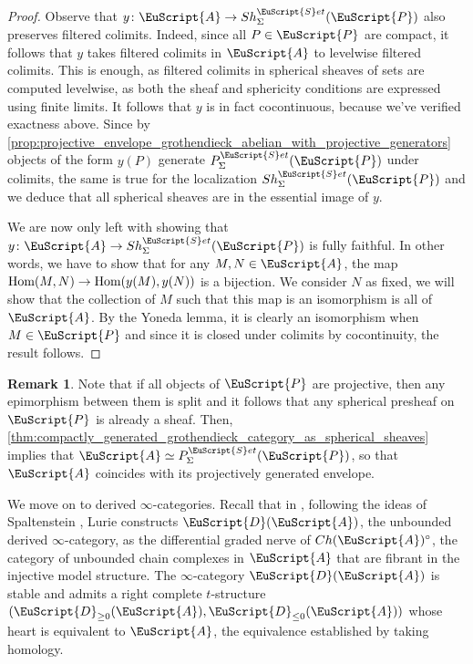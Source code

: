 \documentclass[oneside,a4paper]{amsart}
\newcommand{\euscr}[1]{\EuScript{#1}} %
\newcommand{\acat}{\euscr{A}} %
\newcommand{\dcat}{\euscr{D}} %
\newcommand{\pcat}{\euscr{P}} %
\newcommand{\Hom}{\textnormal{Hom}} %
\newcommand{\sets}{\euscr{S}et} %
\theoremstyle{plain}
\theoremstyle{definition}
\newtheorem{rem}[thm]{Remark}
\theoremstyle{remark}
\begin{document}
\begin{proof}
Observe that $y \colon \acat \rightarrow Sh_{\Sigma}^{\sets}(\pcat)$ also preserves filtered colimits. Indeed, since all $P \in \pcat$ are compact, it follows that $y$ takes filtered colimits in $\acat$ to levelwise filtered colimits. This is enough, as filtered colimits in spherical sheaves of sets are computed levelwise, as both the sheaf and sphericity conditions are expressed using finite limits. It follows that $y$ is in fact cocontinuous, because we've verified exactness above. Since by \cref{prop:projective_envelope_grothendieck_abelian_with_projective_generators} objects of the form $y(P)$ generate $P_{\Sigma}^{\sets}(\pcat)$ under colimits, the same is true for the localization $Sh_{\Sigma}^{\sets}(\pcat)$ and we deduce that all spherical sheaves are in the essential image of $y$. 

We are now only left with showing that $y \colon \acat \rightarrow Sh_{\Sigma}^{\sets}(\pcat)$ is fully faithful. In other words, we have to show that for any $M, N \in \acat$, the map $\Hom(M, N) \rightarrow \Hom(y(M), y(N))$ is a bijection. We consider $N$ as fixed, we will show that the collection of $M$ such that this map is an isomorphism is all of $\acat$. By the Yoneda lemma, it is clearly an isomorphism when $M \in \pcat$ and since it is closed under colimits by cocontinuity, the result follows.
\end{proof}

\begin{rem}
\label{rem:grothendieck_category_generated_by_compact_projectives_as_a_presheaf_category}
Note that if all objects of $\pcat$ are projective, then any epimorphism between them is split and it follows that any spherical presheaf on $\pcat$ is already a sheaf. Then, \cref{thm:compactly_generated_grothendieck_category_as_spherical_sheaves} implies that $\acat \simeq P_{\Sigma}^{\sets}(\pcat)$, so that $\acat$ coincides with its projectively generated envelope. 
\end{rem}

We move on to derived $\infty$-categories. Recall that in \cite[1.3.5]{higher_algebra}, following the ideas of Spaltenstein \cite{spaltenstein1988resolutions}, Lurie constructs $\dcat(\acat)$, the unbounded derived $\infty$-category, as the differential graded nerve of $Ch(\acat)^{\circ}$, the category of unbounded chain complexes in $\acat$ that are fibrant in the injective model structure. The $\infty$-category $\dcat(\acat)$ is stable and admits a right complete $t$-structure $(\dcat_{\geq 0}(\acat), \dcat_{\leq 0}(\acat))$ whose heart is equivalent to $\acat$, the equivalence established by taking homology.
\end{document}
